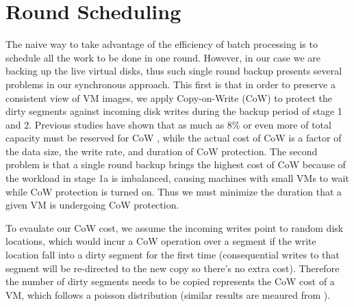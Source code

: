 \section{Round Scheduling}
\label{sect:scheduling}
The naive way to take advantage of the efficiency of batch processing is to
schedule all the work to be done in one round.  
However, in our case we are backing up the
live virtual disks, thus such single round backup presents several problems
in our synchronous approach.
This first is that in order to preserve a consistent view of VM images, we apply
Copy-on-Write (CoW) to protect the dirty segments against incoming disk writes during 
the backup period of stage 1 and 2.
Previous studies have shown that as much as 8\% or even more of total capacity must be reserved for
CoW \cite{EMCIncrementalDataChanges}, while the actual cost of CoW is a factor of the
data size, the write rate, and duration of CoW protection.
The second problem is that a single round backup brings the highest cost of CoW
because of the workload in stage 1a is imbalanced,
causing machines with small VMs to wait while CoW protection is turned on.
Thus we must minimize the duration that a given VM is undergoing CoW protection.

To evaulate our CoW cost, we assume the incoming writes point to random disk locations, 
which would incur a CoW operation over a segment if the write location fall into a dirty segment
for the first time (consequential writes to that segment will be re-directed 
to the new copy so there's no extra cost). Therefore the number of dirty segments needs to be copied represents
the CoW cost of a VM, which follows a poisson distribution (similar results are meaured from \cite{EMCIncrementalDataChanges}).

